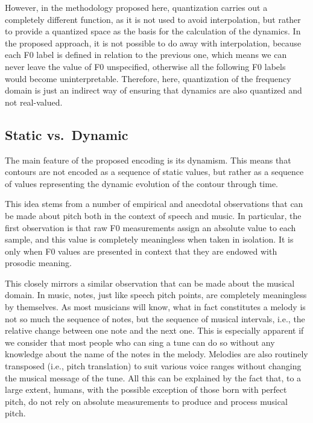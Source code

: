 However, in the methodology proposed here, quantization carries out a completely different function, as it is not used to avoid interpolation, but rather to provide a quantized space as the basis for the calculation of the dynamics.
In the proposed approach, it is not possible to do away with interpolation, because each \ac{F0} label is defined in relation to the previous one, which means we can never leave the value of \ac{F0} unspecified, otherwise all the following \ac{F0} labels would become uninterpretable. 
Therefore, here, quantization of the frequency domain is just an indirect way of ensuring that dynamics are also quantized and not real-valued.



\subsection{Static vs.\ Dynamic}

The main feature of the proposed encoding is its dynamism.
This means that contours are not encoded as a sequence of static values, but rather as a sequence of values representing the dynamic evolution of the contour through time.

This idea stems from a number of empirical and anecdotal observations that can be made about pitch both in the context of speech and music.
In particular, the first observation is that raw \ac{F0} measurements assign an absolute value to each sample, and this value is completely meaningless when taken in isolation.
It is only when \ac{F0} values are presented in context that they are endowed with prosodic meaning.

This closely mirrors a similar observation that can be made about the musical domain.
In music, notes, just like speech pitch points, are completely meaningless by themselves.
As most musicians will know, what in fact constitutes a melody is not so much the sequence of notes, but the sequence of musical intervals, i.e., the relative change between one note and the next one. 
This is especially apparent if we consider that most people who can sing a tune can do so without any knowledge about the name of the notes in the melody. 
Melodies are also routinely transposed (i.e., pitch translation) to suit various voice ranges without changing the musical message of the tune.
All this can be explained by the fact that, to a large extent, humans, with the possible exception of those born with perfect pitch, do not rely on absolute measurements to produce and process musical pitch.
 
